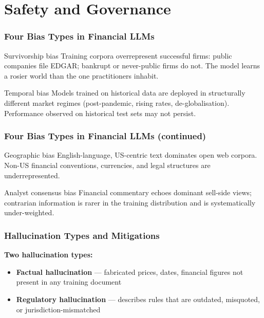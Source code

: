 \documentclass[9pt,t]{beamer}
\begin{document}
\section{Safety and Governance}

\begin{frame}
\frametitle{Four Bias Types in Financial LLMs}

\begin{alertblock}{Survivorship bias}
  Training corpora overrepresent successful firms: public companies file EDGAR;
  bankrupt or never-public firms do not. The model learns a rosier world than
  the one practitioners inhabit.
\end{alertblock}

\medskip
\begin{block}{Temporal bias}
  Models trained on historical data are deployed in structurally different
  market regimes (post-pandemic, rising rates, de-globalisation). Performance
  observed on historical test sets may not persist.
\end{block}
\end{frame}

\begin{frame}
\frametitle{Four Bias Types in Financial LLMs (continued)}

\begin{block}{Geographic bias}
  English-language, US-centric text dominates open web corpora. Non-US financial
  conventions, currencies, and legal structures are underrepresented.
\end{block}

\medskip
\begin{block}{Analyst consensus bias}
  Financial commentary echoes dominant sell-side views; contrarian information
  is rarer in the training distribution and is systematically under-weighted.
\end{block}
\end{frame}

\begin{frame}
\frametitle{Hallucination Types and Mitigations}

\textbf{Two hallucination types:}
\begin{itemize}
  \item \textbf{Factual hallucination} --- fabricated prices, dates, financial figures
        not present in any training document
  \item \textbf{Regulatory hallucination} --- describes rules that are outdated,
        misquoted, or jurisdiction-mismatched
\end{itemize}
\end{frame}
\end{document}
